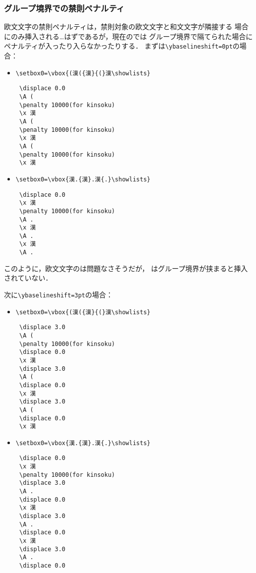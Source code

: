 \documentclass[paper=a4,twocolumn,line_length=24zw,number_of_lines=43]{jlreq}
\begin{document}
\subsubsection{グループ境界での禁則ペナルティ}

欧文文字の禁則ペナルティは，禁則対象の欧文文字と和文文字が隣接する
場合にのみ挿入される…はずであるが，現在の\pTeX では
グループ境界で隔てられた場合にペナルティが入ったり入らなかったりする．
まずは\verb+\ybaselineshift=0pt+の場合：
\begin{itemize}
  \item \verb+\setbox0=\vbox{(漢({漢}{(}漢\showlists}+
\begin{verbnote}
\begin{verbatim}
 \displace 0.0
 \A (
 \penalty 10000(for kinsoku)
 \x 漢
 \A (
 \penalty 10000(for kinsoku)
 \x 漢
 \A (
 \penalty 10000(for kinsoku)
 \x 漢
\end{verbatim}
\end{verbnote}
  \item \verb+\setbox0=\vbox{漢.{漢}.漢{.}\showlists}+
\begin{verbnote}
\begin{verbatim}
 \displace 0.0
 \x 漢
 \penalty 10000(for kinsoku)
 \A .
 \x 漢
 \A .
 \x 漢
 \A .
\end{verbatim}
\end{verbnote}
\end{itemize}
このように，欧文文字のは問題なさそうだが，
はグループ境界が挟まると挿入されていない．

次に\verb+\ybaselineshift=3pt+の場合：
\begin{itemize}
  \item \verb+\setbox0=\vbox{(漢({漢}{(}漢\showlists}+
\begin{verbnote}
\begin{verbatim}
 \displace 3.0
 \A (
 \penalty 10000(for kinsoku)
 \displace 0.0
 \x 漢
 \displace 3.0
 \A (
 \displace 0.0
 \x 漢
 \displace 3.0
 \A (
 \displace 0.0
 \x 漢
\end{verbatim}
\end{verbnote}
  \item \verb+\setbox0=\vbox{漢.{漢}.漢{.}\showlists}+
\begin{verbnote}
\begin{verbatim}
 \displace 0.0
 \x 漢
 \penalty 10000(for kinsoku)
 \displace 3.0
 \A .
 \displace 0.0
 \x 漢
 \displace 3.0
 \A .
 \displace 0.0
 \x 漢
 \displace 3.0
 \A .
 \displace 0.0
\end{verbatim}
\end{verbnote}
\end{itemize}
\end{document}
